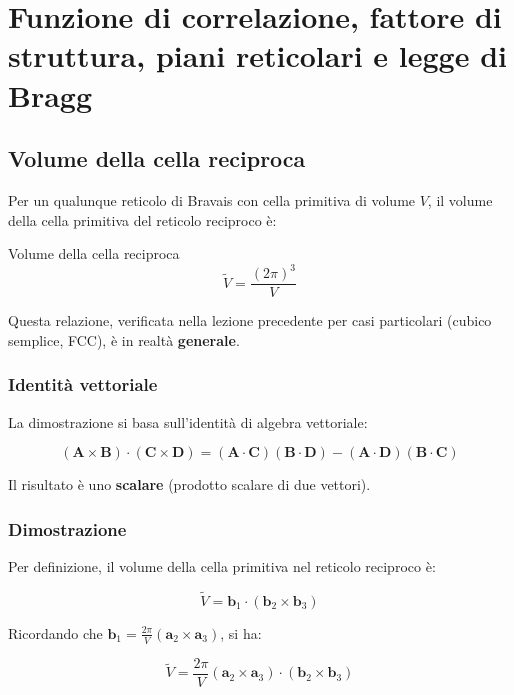 \chapter{Funzione di correlazione, fattore di struttura, piani reticolari e legge di Bragg}

\section{Volume della cella reciproca}
Per un qualunque reticolo di Bravais con cella primitiva di volume $V$, il volume della cella primitiva del reticolo reciproco è:

\begin{equazione}{Volume della cella reciproca}
\begin{equation}
\tilde{V} = \frac{(2\pi)^3}{V}
\end{equation}
\end{equazione}

Questa relazione, verificata nella lezione precedente per casi particolari (cubico semplice, FCC), è in realtà \textbf{generale}.

\subsection*{Identità vettoriale}

La dimostrazione si basa sull'identità di algebra vettoriale:

\begin{equation}
(\mathbf{A} \times \mathbf{B}) \cdot (\mathbf{C} \times \mathbf{D}) = (\mathbf{A} \cdot \mathbf{C})(\mathbf{B} \cdot \mathbf{D}) - (\mathbf{A} \cdot \mathbf{D})(\mathbf{B} \cdot \mathbf{C})
\end{equation}

Il risultato è uno \textbf{scalare} (prodotto scalare di due vettori).

\subsection*{Dimostrazione}

Per definizione, il volume della cella primitiva nel reticolo reciproco è:

$$\tilde{V} = \mathbf{b}_1 \cdot (\mathbf{b}_2 \times \mathbf{b}_3)$$

Ricordando che $\mathbf{b}_1 = \frac{2\pi}{V}(\mathbf{a}_2 \times \mathbf{a}_3)$, si ha:

$$\tilde{V} = \frac{2\pi}{V}(\mathbf{a}_2 \times \mathbf{a}_3) \cdot (\mathbf{b}_2 \times \mathbf{b}_3)$$

